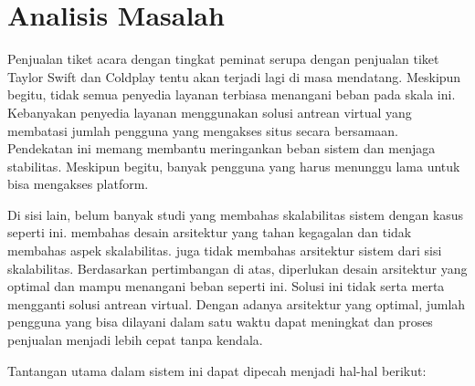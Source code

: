 
\section{Analisis Masalah}

Penjualan tiket acara dengan tingkat peminat serupa dengan penjualan tiket Taylor Swift dan Coldplay tentu akan terjadi lagi di masa mendatang. Meskipun begitu, tidak semua penyedia layanan terbiasa menangani beban pada skala ini. Kebanyakan penyedia layanan menggunakan solusi antrean virtual yang membatasi jumlah pengguna yang mengakses situs secara bersamaan. Pendekatan ini memang membantu meringankan beban sistem dan menjaga stabilitas. Meskipun begitu, banyak pengguna yang harus menunggu lama untuk bisa mengakses platform.

Di sisi lain, belum banyak studi yang membahas skalabilitas sistem dengan kasus seperti ini. \cite{microservicesEventDriven} membahas desain arsitektur yang tahan kegagalan dan tidak membahas aspek skalabilitas. \cite{backendForTicketing} juga tidak membahas arsitektur sistem dari sisi skalabilitas. Berdasarkan pertimbangan di atas, diperlukan desain arsitektur yang optimal dan mampu menangani beban seperti ini. Solusi ini tidak serta merta mengganti solusi antrean virtual. Dengan adanya arsitektur yang optimal, jumlah pengguna yang bisa dilayani dalam satu waktu dapat meningkat dan proses penjualan menjadi lebih cepat tanpa kendala.

Tantangan utama dalam sistem ini dapat dipecah menjadi hal-hal berikut:

